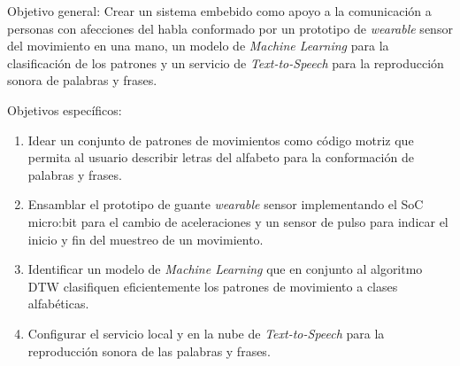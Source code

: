 \hfill\break 
Objetivo general: \hfill\break
Crear un sistema embebido como apoyo a la comunicación a personas con afecciones del habla conformado por un prototipo de \textit{wearable} sensor del movimiento en una mano, un modelo de \textit{Machine Learning} para la clasificación de los patrones y un servicio de \textit{Text-to-Speech} para la reproducción sonora de palabras y frases.

\hfill\break
Objetivos específicos:	
\begin{enumerate}

	\item \justifying Idear un conjunto de patrones de movimientos como código motriz que permita al usuario describir letras del alfabeto para la conformación de palabras y frases.
	
	\item \justifying Ensamblar el prototipo de guante \textit{wearable} sensor implementando el SoC micro:bit para el cambio de aceleraciones y un sensor de pulso para indicar el inicio y fin del muestreo de un movimiento.

	\item \justifying Identificar un modelo de \textit{Machine Learning} que en conjunto al algoritmo DTW clasifiquen eficientemente los patrones de movimiento a clases alfabéticas.
	
	\item \justifying Configurar el servicio local y en la nube de \textit{Text-to-Speech} para la reproducción sonora de las palabras y frases.
\end{enumerate}